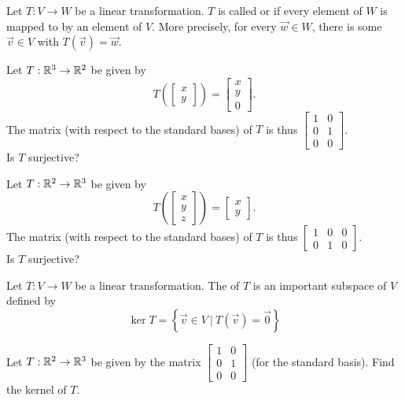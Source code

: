 \begin{applicationActivities}{2}{18}
\begin{definition}
Let $T: V \rightarrow W$ be a linear transformation.
$T$ is called  or  if every element of $W$ is mapped to by an element of $V$.  More precisely, for every $\vec{w} \in W$, there is some $\vec{v} \in V$ with $T(\vec{v})=\vec{w}$.
\end{definition}

\begin{activity}{5}
Let $T: \mathbb{R}^3 \rightarrow \mathbb{R}^2$ be given by $$T\left(\begin{bmatrix}x \\ y \end{bmatrix} \right) = \begin{bmatrix} x \\ y \\ 0 \end{bmatrix}.$$
The matrix (with respect to the standard bases) of $T$ is thus $\begin{bmatrix} 1 & 0 \\ 0 & 1 \\ 0 & 0 \end{bmatrix}$. \\
Is $T$ surjective?
\end{activity}

\begin{activity}{5}
Let $T: \mathbb{R}^2 \rightarrow \mathbb{R}^3$ be given by $$T\left(\begin{bmatrix} x \\ y \\ z \end{bmatrix} \right) = \begin{bmatrix} x \\ y \end{bmatrix}.$$  The matrix (with respect to the standard bases) of $T$ is thus $\begin{bmatrix} 1 & 0 &0  \\ 0 & 1 & 0 \end{bmatrix}$.\\
Is $T$ surjective?
\end{activity}


\begin{definition}
Let $T: V \rightarrow W$ be a linear transformation.  The  of $T$
is an important subspace of \(V\) defined by
\[
\ker T = \left\{ \vec{v} \in V\ \big|\ T(\vec{v})=\vec{0}\right\}
\]
\end{definition}

\begin{activity}{5}
Let $T: \mathbb{R}^2 \rightarrow \mathbb{R}^3$ be given by the matrix $\begin{bmatrix} 1 & 0 \\ 0 & 1 \\ 0 & 0 \end{bmatrix}$ (for the standard basis).  Find the kernel of $T$.
\end{activity}


\end{applicationActivities}
